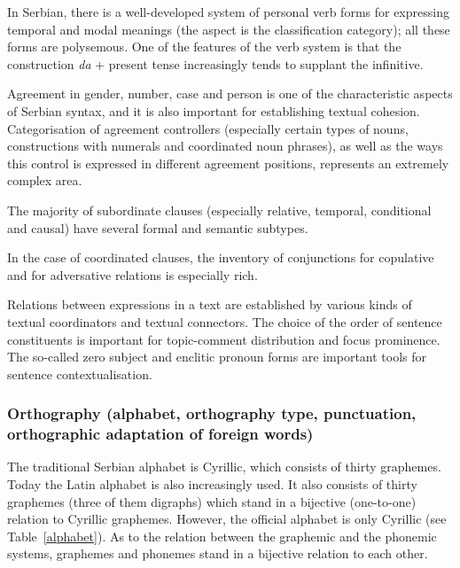 \begin{multicols}{2}
In Serbian, there is a well-developed system of personal verb forms for expressing temporal and modal meanings (the aspect is the classification category); all these forms are polysemous. One of the features of the verb system is that the construction \textit{da} + present tense increasingly tends to supplant the infinitive.

Agreement in gender, number, case and person is one of the characteristic aspects of Serbian syntax, and it is also important for establishing textual cohesion. Categorisation of agreement controllers (especially certain types of nouns, constructions with numerals and coordinated noun phrases), as well as the ways this control is expressed in different agreement positions, represents an extremely complex area. 

The majority of subordinate clauses (especially relative, temporal, conditional and causal) have several formal and semantic subtypes.

In the case of coordinated clauses, the inventory of conjunctions for copulative and for adversative relations is especially rich.

Relations between expressions in a text are established by various kinds of textual coordinators and textual connectors. The choice of the order of sentence constituents is important for topic-comment distribution and focus prominence. The so-called zero subject and enclitic pronoun forms are important tools for sentence contextualisation. 

\subsubsection {Orthography (alphabet, orthography type, punctuation, orthographic adaptation of foreign words)}
  
The traditional Serbian alphabet is Cyrillic, which consists of thirty graphemes. Today the Latin alphabet is also increasingly used. It also consists of thirty graphemes (three of them digraphs) which stand in a bijective (one-to-one) relation to Cyrillic graphemes. However, the official alphabet is only Cyrillic (see Table~\ref{alphabet}).
As to the relation between the graphemic and the phonemic systems, graphemes and phonemes stand in a bijective relation to each other. 


\end{multicols}
